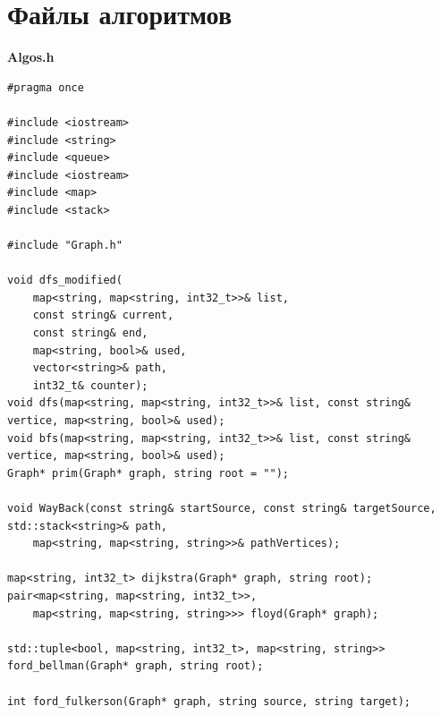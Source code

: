 \documentclass[otchet]{SCWorks}
\begin{document}
\section{Файлы алгоритмов}
\label{Algos}

\textbf{Algos.h}

\begin{verbatim}
#pragma once

#include <iostream>
#include <string>
#include <queue>
#include <iostream>
#include <map>
#include <stack>

#include "Graph.h"

void dfs_modified(
	map<string, map<string, int32_t>>& list,
	const string& current,
	const string& end,
	map<string, bool>& used,
	vector<string>& path,
	int32_t& counter);
void dfs(map<string, map<string, int32_t>>& list, const string& vertice, map<string, bool>& used);
void bfs(map<string, map<string, int32_t>>& list, const string& vertice, map<string, bool>& used);
Graph* prim(Graph* graph, string root = "");

void WayBack(const string& startSource, const string& targetSource, std::stack<string>& path,
	map<string, map<string, string>>& pathVertices);

map<string, int32_t> dijkstra(Graph* graph, string root);
pair<map<string, map<string, int32_t>>,
	map<string, map<string, string>>> floyd(Graph* graph);

std::tuple<bool, map<string, int32_t>, map<string, string>> ford_bellman(Graph* graph, string root);

int ford_fulkerson(Graph* graph, string source, string target);
\end{verbatim}
\end{document}
